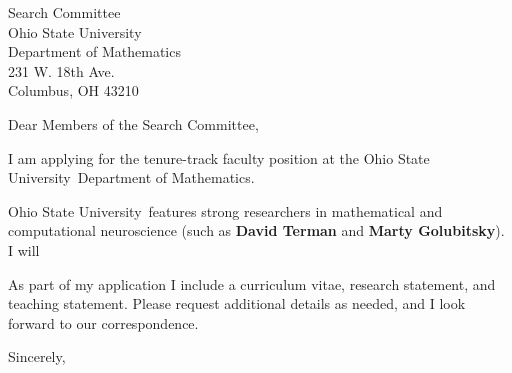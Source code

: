 \documentclass[11pt,a4paper]{letter}
\begin{document}
\def\School{Ohio State University}
\begin{letter}
{Search Committee\\
Ohio State University\\
Department of Mathematics\\
231 W. 18th Ave.\\
Columbus, OH 43210}


\opening{Dear Members of the Search Committee,}

I am applying for the tenure-track faculty position at the \School~Department of Mathematics. 



\School~features strong researchers in mathematical and computational neuroscience (such as \textbf{David Terman} and \textbf{Marty Golubitsky}). I will 



As part of my application I include a curriculum vitae, research statement, and teaching statement. Please request additional details as needed, and I look forward to our correspondence.

\closing{Sincerely,}
\end{letter}
\end{document}
